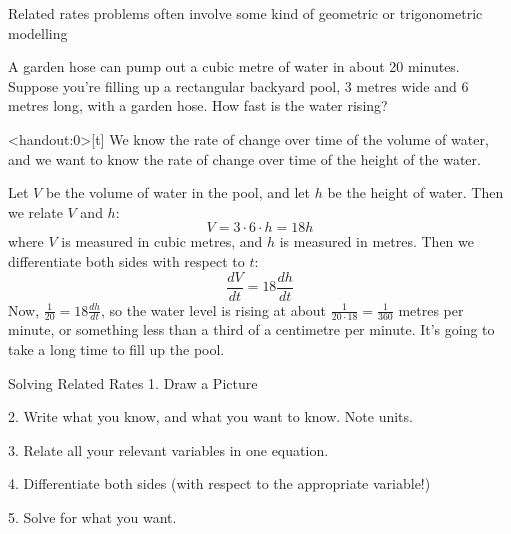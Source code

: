 \begin{frame}[t]
\begin{center}\color{C3}
Related rates problems often involve some kind of geometric or trigonometric modelling
\end{center}
\AnswerYes



A garden hose can pump out a cubic metre of water in about 20 minutes. Suppose you're filling up a rectangular backyard pool, 3 metres wide and 6 metres long, with a garden hose. How fast is the water rising?
\end{frame}
\begin{frame}<handout:0>[t]
\color{answercolor}
We know the rate of change over time of the volume of water, and we want to know the rate of change over time of the height of the water.

\bigskip
 Let $V$ be the volume of water in the pool, and let $h$ be the height of water. Then we relate $V$ and $h$:
\[V = 3 \cdot 6 \cdot h = 18h\]
where $V$ is measured in cubic metres, and $h$ is measured in metres. Then we differentiate both sides with respect to $t$:
\[\frac{dV}{dt} = 18\frac{dh}{dt}\]
Now, $\frac{1}{20} = 18\frac{dh}{dt}$, so the water level is rising at about $\frac{1}{20\cdot 18} = \frac{1}{360}$ metres per minute, or something less than a third of a centimetre per minute. It's going to take a long time to fill up the pool.
\end{frame}
\begin{frame}{Solving Related Rates}
1. Draw a Picture
\vfill

2. Write what you know, and what you want to know. Note units.\vfill

\color{M4}3. Relate all your relevant variables in one equation.\vfill\color{black}

4. Differentiate both sides (with respect to the appropriate variable!)\vfill

5. Solve for what you want.

\end{frame}

